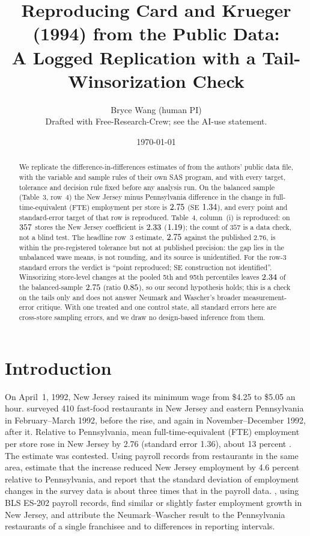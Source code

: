 \documentclass[11pt]{article}
\title{Reproducing Card and Krueger (1994) from the Public Data:\\
A Logged Replication with a Tail-Winsorization Check}
\author{Bryce Wang (human PI) \\ \small Drafted with Free-Research-Crew; see the AI-use statement.}
\date{\today}
\begin{document}
\maketitle

\begin{abstract}
\noindent
We replicate the difference-in-differences estimates of \citet{card1994minimum} from the
authors' public data file, with the variable and sample rules of their own SAS program, and
with every target, tolerance and decision rule fixed before any analysis run. On the
balanced sample (Table~3, row~4) the New Jersey minus Pennsylvania difference in the change
in full-time-equivalent (FTE) employment per store is $2.75$ (SE
$1.34$), and every point and standard-error target of that row is reproduced.
Table~4, column~(i) is reproduced: on $357$ stores the New Jersey coefficient is
$2.33$ ($1.19$); the count of $357$ is a data check, not a blind test. The headline
row~3 estimate, $2.75$ against the published $2.76$, is within the pre-registered
tolerance but not at published precision: the gap lies in the unbalanced wave means, is not
rounding, and its source is unidentified. For the row-3 standard errors the verdict is
``point reproduced; SE construction not identified''. Winsorizing store-level changes at the
pooled 5th and 95th percentiles leaves $2.34$ of the balanced-sample
$2.75$ (ratio $0.85$), so our second hypothesis holds; this is a check
on the tails only and does not answer Neumark and Wascher's broader measurement-error
critique. With one treated and one control state, all standard errors here are cross-store
sampling errors, and we draw no design-based inference from them.
\end{abstract}

\section{Introduction}

On April~1, 1992, New Jersey raised its minimum wage from \$4.25 to \$5.05 an hour.
\citet{card1994minimum} surveyed 410 fast-food restaurants in New Jersey and eastern
Pennsylvania in February--March 1992, before the rise, and again in November--December 1992,
after it. Relative to Pennsylvania, mean full-time-equivalent (FTE) employment per store
rose in New Jersey by 2.76 (standard error 1.36), about 13 percent
\citep[Table~3, row~3]{card1994minimum}. The estimate was contested. Using payroll records from restaurants in the same area,
\citet{neumark1995payroll} estimate that the increase reduced New Jersey employment by
4.6 percent relative to Pennsylvania, and report that the standard deviation of employment
changes in the survey data is about three times that in the payroll data.
\citet{card1998reanalysis}, using BLS ES-202 payroll records, find similar or slightly
faster employment growth in New Jersey, and attribute the Neumark--Wascher result to the
Pennsylvania restaurants of a single franchisee and to differences in reporting intervals.
\end{document}
